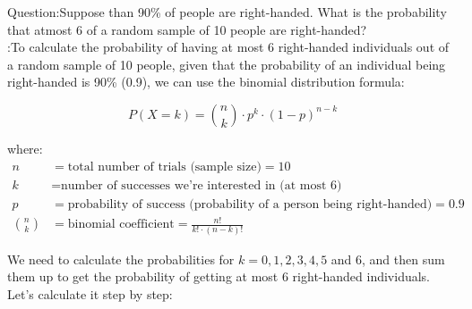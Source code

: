 \documentclass[journal,12pt,onecolumn]{IEEEtran}
\theoremstyle{remark}
\begin{document}
\let\vec\mathbf




\vspace{3cm}



\bigskip

\renewcommand{\thefigure}{\theenumi}
\renewcommand{\thetable}{\theenumi}

Question:Suppose than 90\% of people are right-handed. What is the probability that atmost 6 of a random sample of 10 people are right-handed? 
\\ \solution:To calculate the probability of having at most 6 right-handed individuals out of a random sample of 10 people, given that the probability of an individual being right-handed is 90\% (0.9), we can use the binomial distribution formula:

\begin{equation}
P(X = k) = \binom{n}{k} \cdot p^k \cdot (1 - p)^{n - k}
\end{equation}

where:
\begin{align}
n & = \text{total number of trials (sample size)} = 10 \\
k & = \text{number of successes we're interested in (at most 6)} \\
p & = \text{probability of success (probability of a person being right-handed)} = 0.9 \\
\binom{n}{k} & = \text{binomial coefficient} = \frac{n!}{k! \cdot (n - k)!}
\end{align}

We need to calculate the probabilities for $ k = 0, 1, 2, 3, 4, 5 $ and $6$, and then sum them up to get the probability of getting at most 6 right-handed individuals.
Let's calculate it step by step:
\end{document}

